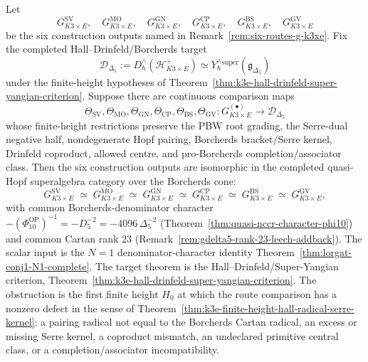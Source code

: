 \begin{theorem}
\label{conj:six-routes-k3xE-convergence}
\label{thm:six-routes-k3xE-conditional-convergence}
Let
\[
 G^{\mathrm{SV}}_{K3 \times E},\quad
 G^{\mathrm{MO}}_{K3 \times E},\quad
 G^{\mathrm{GN}}_{K3 \times E},\quad
 G^{\mathrm{CP}}_{K3 \times E},\quad
 G^{\mathrm{BS}}_{K3 \times E},\quad
 G^{\mathrm{GV}}_{K3 \times E}
\]
be the six construction outputs named in
Remark~\ref{rem:six-routes-g-k3xe}. Fix the completed
Hall--Drinfeld/Borcherds target
\[
 \mathscr D_{\Delta_5}
 :=
 D^\wedge_\hbar(\mathcal H^+_{K3\times E})
 \simeq
 Y^\wedge_\hbar{}^{\mathrm{super}}(\mathfrak g_{\Delta_5})
\]
under the finite-height hypotheses of
Theorem~\ref{thm:k3e-hall-drinfeld-super-yangian-criterion}. Suppose
there are continuous comparison maps
\[
 \Theta_{\mathrm{SV}},\Theta_{\mathrm{MO}},\Theta_{\mathrm{GN}},
 \Theta_{\mathrm{CP}},\Theta_{\mathrm{BS}},\Theta_{\mathrm{GV}}
 \colon
 G^{(\bullet)}_{K3 \times E}\longrightarrow \mathscr D_{\Delta_5}
\]
whose finite-height restrictions preserve the PBW root grading, the
Serre-dual negative half, nondegenerate Hopf pairing, Borcherds bracket/Serre
kernel, Drinfeld coproduct, allowed centre, and pro-Borcherds
completion/associator class. Then the six construction outputs are
isomorphic in the completed quasi-Hopf superalgebra category over the
Borcherds cone:
\[
 G^{\mathrm{SV}}_{K3 \times E} \;\simeq\; G^{\mathrm{MO}}_{K3 \times E} \;\simeq\; G^{\mathrm{GN}}_{K3 \times E} \;\simeq\; G^{\mathrm{CP}}_{K3 \times E} \;\simeq\; G^{\mathrm{BS}}_{K3 \times E} \;\simeq\; G^{\mathrm{GV}}_{K3 \times E},
\]
with common Borcherds-denominator character
\(-(\Phi_{10}^{\mathrm{OP}})^{-1}=-D_5^{-2}=-4096\,\Delta_5^{-2}\)
(Theorem~\ref{thm:quasi-nccr-character-phi10})
and common Cartan rank $23$ (Remark~\ref{rem:gdelta5-rank-23-leech-addback}).
The scalar input is the \(N=1\) denominator-character identity
Theorem~\ref{thm:lorgat-conj1-N1-complete}. The target theorem is the
Hall--Drinfeld/Super-Yangian criterion,
Theorem~\ref{thm:k3e-hall-drinfeld-super-yangian-criterion}. The
obstruction is the first finite height \(H_0\) at which the route
comparison has a nonzero defect in the sense of
Theorem~\ref{thm:k3e-finite-height-hall-radical-serre-kernel}: a
pairing radical not equal to the Borcherds Cartan radical, an excess
or missing Serre kernel, a coproduct mismatch, an undeclared primitive
central class, or a completion/associator incompatibility.
\end{theorem}

